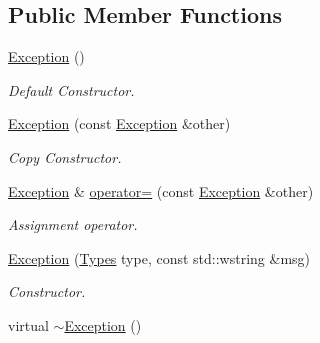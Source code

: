 \subsection*{Public Member Functions}
\begin{DoxyCompactItemize}
\item 
\hypertarget{classxmlnode_1_1_c_xml_node_1_1_exception_ad3078912e0a640db79884170176cb0a8}{\hyperlink{classxmlnode_1_1_c_xml_node_1_1_exception_ad3078912e0a640db79884170176cb0a8}{Exception} ()}\label{classxmlnode_1_1_c_xml_node_1_1_exception_ad3078912e0a640db79884170176cb0a8}

\begin{DoxyCompactList}\small\item\em Default Constructor. \end{DoxyCompactList}\item 
\hyperlink{classxmlnode_1_1_c_xml_node_1_1_exception_aaefc2a485cf66513101ac27c2389c819}{Exception} (const \hyperlink{classxmlnode_1_1_c_xml_node_1_1_exception}{Exception} \&other)
\begin{DoxyCompactList}\small\item\em Copy Constructor. \end{DoxyCompactList}\item 
\hyperlink{classxmlnode_1_1_c_xml_node_1_1_exception}{Exception} \& \hyperlink{classxmlnode_1_1_c_xml_node_1_1_exception_a40c0f5e49e54cd97c4643c71fbc34014}{operator=} (const \hyperlink{classxmlnode_1_1_c_xml_node_1_1_exception}{Exception} \&other)
\begin{DoxyCompactList}\small\item\em Assignment operator. \end{DoxyCompactList}\item 
\hyperlink{classxmlnode_1_1_c_xml_node_1_1_exception_ad660bb87054a9483c0933efbaddfaa55}{Exception} (\hyperlink{classxmlnode_1_1_c_xml_node_1_1_exception_abdbe07531ef4b19192f1fa2f819ed75f}{Types} type, const std\+::wstring \&msg)
\begin{DoxyCompactList}\small\item\em Constructor. \end{DoxyCompactList}\item 
\hypertarget{classxmlnode_1_1_c_xml_node_1_1_exception_ae22ca483e7821c057dec85f06a5e4d32}{virtual \hyperlink{classxmlnode_1_1_c_xml_node_1_1_exception_ae22ca483e7821c057dec85f06a5e4d32}{$\sim$\+Exception} ()}\label{classxmlnode_1_1_c_xml_node_1_1_exception_ae22ca483e7821c057dec85f06a5e4d32}


\end{DoxyCompactItemize}
